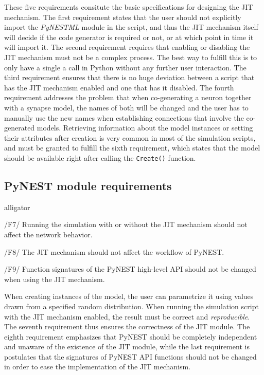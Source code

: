 These five requirements consitute the basic specifications for designing the JIT mechanism. The first requirement states that the user should not explicitly import the \emph{PyNESTML} module in the script, and thus the JIT mechanism itself will decide if the code generator is required or not, or at which point in time it will import it. The second requirement requires that enabling or disabling the JIT mechanism must not be a complex process. The best way to fulfill this is to only have a single a call in Python without any further user interaction. The third requirement ensures that there is no huge deviation between a script that has the JIT mechanism enabled and one that has it disabled. The fourth requirement addresses the problem that when co-generating a neuron together with a synapse model, the names of both will be changed and the user has to manually use the new names when establishing connections that involve the co-generated models. Retrieving information about the model instances or setting their attributes after creation is very common in most of the simulation scripts, and must be granted to fulfill the sixth requirement, which states that the model should be available right after calling the \texttt{Create()} function.

\subsection*{PyNEST module requirements}

\begin{labeling}{alligator}
   \item[/F7/] Running the simulation with or without the JIT mechanism should not affect the network behavior.
   \item[/F8/] The JIT mechanism should not affect the workflow of PyNEST.
   \item[/F9/] Function signatures of the PyNEST high-level API should not be changed when using the JIT mechanism.
\end{labeling}

When creating instances of the model, the user can parametrize it using values drawn from a specified random distribution. When running the simulation script with the JIT mechanism enabled, the result must be correct and \emph{reproducible}. The seventh requirement thus ensures the correctness of the JIT module. The eighth requirement emphasizes that PyNEST should be completely independent and unaware of the existence of the JIT module, while the last requirement is postulates that the signatures of PyNEST API functions should not be changed in order to ease the implementation of the JIT mechanism.

